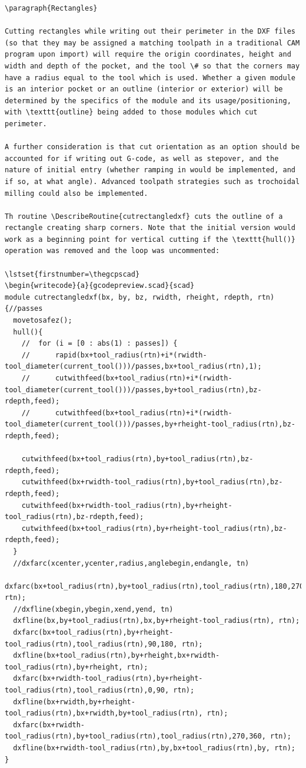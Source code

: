 \documentclass{ltxdoc}
\begin{document}
\begin{verbatim}
\paragraph{Rectangles}

Cutting rectangles while writing out their perimeter in the DXF files (so that they may be assigned a matching toolpath in a traditional CAM program upon import) will require the origin coordinates, height and width and depth of the pocket, and the tool \# so that the corners may have a radius equal to the tool which is used. Whether a given module is an interior pocket or an outline (interior or exterior) will be determined by the specifics of the module and its usage/positioning, with \texttt{outline} being added to those modules which cut perimeter.

A further consideration is that cut orientation as an option should be accounted for if writing out G-code, as well as stepover, and the nature of initial entry (whether ramping in would be implemented, and if so, at what angle). Advanced toolpath strategies such as trochoidal milling could also be implemented.

Th routine \DescribeRoutine{cutrectangledxf} cuts the outline of a rectangle creating sharp corners. Note that the initial version would work as a beginning point for vertical cutting if the \texttt{hull()} operation was removed and the loop was uncommented:
 
\lstset{firstnumber=\thegcpscad}
\begin{writecode}{a}{gcodepreview.scad}{scad}
module cutrectangledxf(bx, by, bz, rwidth, rheight, rdepth, rtn) {//passes
  movetosafez();
  hull(){
    //  for (i = [0 : abs(1) : passes]) {
    //      rapid(bx+tool_radius(rtn)+i*(rwidth-tool_diameter(current_tool()))/passes,bx+tool_radius(rtn),1);
    //      cutwithfeed(bx+tool_radius(rtn)+i*(rwidth-tool_diameter(current_tool()))/passes,by+tool_radius(rtn),bz-rdepth,feed);
    //      cutwithfeed(bx+tool_radius(rtn)+i*(rwidth-tool_diameter(current_tool()))/passes,by+rheight-tool_radius(rtn),bz-rdepth,feed);
  
    cutwithfeed(bx+tool_radius(rtn),by+tool_radius(rtn),bz-rdepth,feed);
    cutwithfeed(bx+rwidth-tool_radius(rtn),by+tool_radius(rtn),bz-rdepth,feed);
    cutwithfeed(bx+rwidth-tool_radius(rtn),by+rheight-tool_radius(rtn),bz-rdepth,feed);
    cutwithfeed(bx+tool_radius(rtn),by+rheight-tool_radius(rtn),bz-rdepth,feed);
  }
  //dxfarc(xcenter,ycenter,radius,anglebegin,endangle, tn)
  dxfarc(bx+tool_radius(rtn),by+tool_radius(rtn),tool_radius(rtn),180,270, rtn);
  //dxfline(xbegin,ybegin,xend,yend, tn)
  dxfline(bx,by+tool_radius(rtn),bx,by+rheight-tool_radius(rtn), rtn);
  dxfarc(bx+tool_radius(rtn),by+rheight-tool_radius(rtn),tool_radius(rtn),90,180, rtn);
  dxfline(bx+tool_radius(rtn),by+rheight,bx+rwidth-tool_radius(rtn),by+rheight, rtn);
  dxfarc(bx+rwidth-tool_radius(rtn),by+rheight-tool_radius(rtn),tool_radius(rtn),0,90, rtn);
  dxfline(bx+rwidth,by+rheight-tool_radius(rtn),bx+rwidth,by+tool_radius(rtn), rtn);
  dxfarc(bx+rwidth-tool_radius(rtn),by+tool_radius(rtn),tool_radius(rtn),270,360, rtn);
  dxfline(bx+rwidth-tool_radius(rtn),by,bx+tool_radius(rtn),by, rtn);
}


\end{verbatim}
\end{document}
